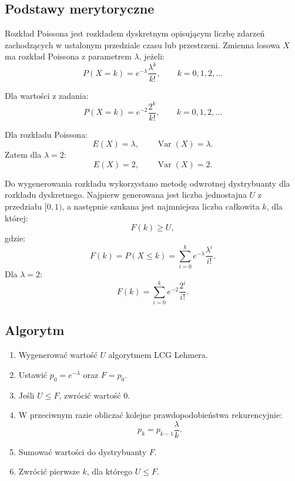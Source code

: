 \documentclass[12pt,a4paper]{article}
\begin{document}
\subsection{Podstawy merytoryczne}

Rozkład Poissona jest rozkładem dyskretnym opisującym liczbę zdarzeń zachodzących w ustalonym przedziale czasu lub przestrzeni. Zmienna losowa $X$ ma rozkład Poissona z parametrem $\lambda$, jeżeli:
\begin{equation}
  P(X=k) = e^{-\lambda}\frac{\lambda^k}{k!},\qquad k=0,1,2,\ldots
\end{equation}

Dla wartości z zadania:
\begin{equation}
  P(X=k) = e^{-2}\frac{2^k}{k!},\qquad k=0,1,2,\ldots
\end{equation}

Dla rozkładu Poissona:
\begin{equation}
  E(X)=\lambda,\qquad \operatorname{Var}(X)=\lambda.
\end{equation}
Zatem dla $\lambda=2$:
\begin{equation}
  E(X)=2,\qquad \operatorname{Var}(X)=2.
\end{equation}

Do wygenerowania rozkładu wykorzystano metodę odwrotnej dystrybuanty dla rozkładu dyskretnego. Najpierw generowana jest liczba jednostajna $U$ z przedziału $[0,1)$, a następnie szukana jest najmniejsza liczba całkowita $k$, dla której:
\begin{equation}
  F(k) \geq U,
\end{equation}
gdzie:
\begin{equation}
  F(k)=P(X\leq k)=\sum_{i=0}^{k} e^{-\lambda}\frac{\lambda^i}{i!}.
\end{equation}
Dla $\lambda=2$:
\begin{equation}
  F(k)=\sum_{i=0}^{k} e^{-2}\frac{2^i}{i!}.
\end{equation}

\subsection{Algorytm}

\begin{enumerate}
  \item Wygenerować wartość $U$ algorytmem LCG Lehmera.
  \item Ustawić $p_0=e^{-\lambda}$ oraz $F=p_0$.
  \item Jeśli $U\leq F$, zwrócić wartość $0$.
  \item W przeciwnym razie obliczać kolejne prawdopodobieństwa rekurencyjnie:
  \begin{equation}
    p_k = p_{k-1}\frac{\lambda}{k}.
  \end{equation}
  \item Sumować wartości do dystrybuanty $F$.
  \item Zwrócić pierwsze $k$, dla którego $U\leq F$.
\end{enumerate}
\end{document}
